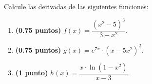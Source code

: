 
Calcule las derivadas de las siguientes funciones:
\begin{enumerate}[label=\alph*)]
\item \textbf{(0.75 puntos)} $f(x)=\dfrac{(x^2-5)^3}{3-x^2}$.
\item \textbf{(0.75 puntos)} $g(x)=e^{7x}\cdot(x-5x^2)^2$.
\item \textbf{(1 punto)} $h(x)=\dfrac{x\cdot\ln(1-x^2)}{x-3}$.
\end{enumerate}
